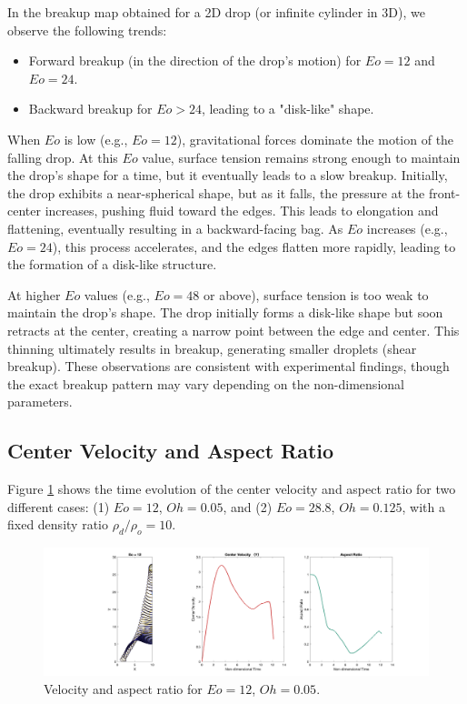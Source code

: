 \documentclass[12pt]{article}
\begin{document}
In the breakup map obtained for a 2D drop (or infinite cylinder in 3D), we observe the following trends:

\begin{itemize}
    \item Forward breakup (in the direction of the drop's motion) for $Eo = 12$ and $Eo = 24$.
    \item Backward breakup for $Eo > 24$, leading to a "disk-like" shape.
\end{itemize}

When $Eo$ is low (e.g., $Eo = 12$), gravitational forces dominate the motion of the falling drop. At this $Eo$ value, surface tension remains strong enough to maintain the drop's shape for a time, but it eventually leads to a slow breakup. Initially, the drop exhibits a near-spherical shape, but as it falls, the pressure at the front-center increases, pushing fluid toward the edges. This leads to elongation and flattening, eventually resulting in a backward-facing bag. As $Eo$ increases (e.g., $Eo = 24$), this process accelerates, and the edges flatten more rapidly, leading to the formation of a disk-like structure.

At higher $Eo$ values (e.g., $Eo = 48$ or above), surface tension is too weak to maintain the drop's shape. The drop initially forms a disk-like shape but soon retracts at the center, creating a narrow point between the edge and center. This thinning ultimately results in breakup, generating smaller droplets (shear breakup). These observations are consistent with experimental findings, though the exact breakup pattern may vary depending on the non-dimensional parameters.

\subsection{Center Velocity and Aspect Ratio}
Figure \ref{fig:velocity_aspect} shows the time evolution of the center velocity and aspect ratio for two different cases: (1) $Eo = 12$, $Oh = 0.05$, and (2) $Eo = 28.8$, $Oh = 0.125$, with a fixed density ratio $\rho_d / \rho_o = 10$.

\begin{figure}[H]
    \centering
    \includegraphics[width=\textwidth]{figures/All_Eo=12__t=0.28.png}
    \caption{Velocity and aspect ratio for $Eo = 12$, $Oh = 0.05$.}
    \label{fig:velocity_aspect}
\end{figure}
\end{document}
